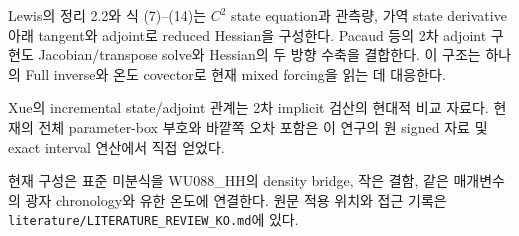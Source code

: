 Lewis의 정리 2.2와 식 (7)--(14)는 $C^2$ state equation과 관측량,
가역 state derivative 아래 tangent와 adjoint로 reduced Hessian을
구성한다. Pacaud 등의 2차 adjoint 구현도 Jacobian/transpose solve와
Hessian의 두 방향 수축을 결합한다. 이 구조는 하나의 Full inverse와
온도 covector로 현재 mixed forcing을 읽는 데 대응한다.
\cite{Lewis1997,PacaudEtAl2022}

Xue의 incremental state/adjoint 관계는 2차 implicit 검산의 현대적
비교 자료다. 현재의 전체 parameter-box 부호와 바깥쪽 오차 포함은
이 연구의 원 signed 자료 및 exact interval 연산에서 직접 얻었다.
\cite{Xue2025}

현재 구성은 표준 미분식을 WU088\_HH의 density bridge, 작은 결함,
같은 매개변수의 광자 chronology와 유한 온도에 연결한다.
원문 적용 위치와 접근 기록은
\nolinkurl{literature/LITERATURE_REVIEW_KO.md}에 있다.
